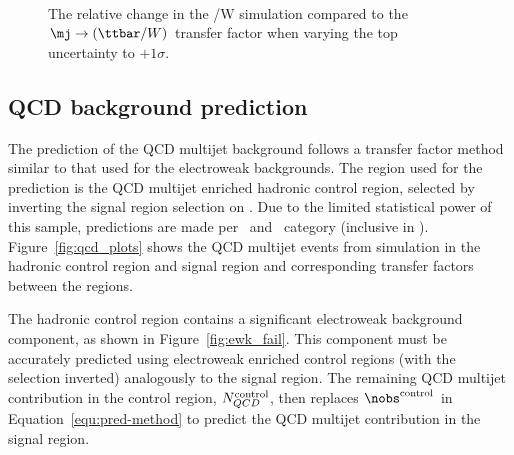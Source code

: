 \begin{figure}[!h]
  \centering
   ~~
  \\
  \caption{\label{fig:tfSimVar} The relative change in the
  \ttbar/W simulation compared to the $\mj \rightarrow (\ttbar/W)$ transfer
  factor when varying the top \pt uncertainty to $+1\sigma$.
  }
\end{figure}

\subsection{QCD background prediction}
\label{sec:qcd-pred}
The prediction of the QCD multijet background follows a transfer factor method
similar to that used for the electroweak backgrounds. The region used
for the prediction is the QCD multijet enriched hadronic control region, 
selected by inverting the signal region selection on \mhtmet. Due to the limited statistical
power of this sample, predictions are made per \njet~and \scalht~category (inclusive in \nb).
Figure~\ref{fig:qcd_plots} shows the QCD multijet events from simulation 
in the hadronic control region and signal region and corresponding transfer factors
between the regions.

The hadronic control region contains a significant electroweak background component, 
as shown in Figure~\ref{fig:ewk_fail}. This component must be accurately predicted
using electroweak enriched control regions (with the \mhtmet selection inverted) analogously 
to the signal region. The remaining QCD multijet contribution in the control region,
$N_{QCD}^{\rm control}$, then replaces $\nobs^{\rm control}$ in Equation~\ref{equ:pred-method} 
to predict the QCD multijet contribution in the signal region. 

